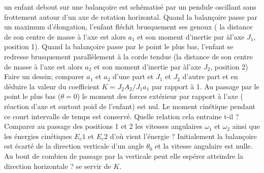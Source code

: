 \begin{Exercise}[title=(*) Mouvement amplifié sur une balançoire]
	un enfant debout sur une balançoire est schématisé par un pendule oscillant sans frottement autour d'un axe de rotation horizontal. Quand la balançoire passe par un maximum d'élongation, l'enfant fléchit brusquement ses genoux ( la distance de son centre de masse à l'axe est alors $a_1$ et son moment d'inertie par àl'axe $J_1$, position 1). Quand la balançoire passe par le point le plus bas, l'enfant se redresse brusquement parallèlement à la corde tendue (la distance de son centre de masse à l'axe est alors $a_2$ et son moment d'inertie par àl'axe $J_2$, position 2)
	\Question Faire un dessin; comparer $a_1$ et $a_2$ d'une part et $J_1$ et $J_2$ d'autre part et en déduire la valeur du coefficient $K= J_2A_2 /J_1a_1$ par rapport à 1.
	Au passage par le point le plus bas ($\theta=0$) le moment des forces extérieur par rapport à l'axe ( réaction d'axe et surtout poid de l'enfant) est nul. Le moment cinétique pendant ce court intervalle de temps est conservé.
	\Question Quelle relation cela entraine t-il ?  Comparer au passage des positions 1 et 2 les vitesses angulaires $\omega_1$ et $\omega_2$ ainsi que les énergies cinétiques $E_c1$ et $E_c2$ d'où vient l'énergie ?
	\Question Initialement la balançoire est écarté de la direction verticale d'un angle $\theta_0$ et la vitesse angulaire est nulle. Au bout de combien de passage par la verticale peut elle espérer atteindre la direction horizontale ? se servir de $K$.
\end{Exercise}
